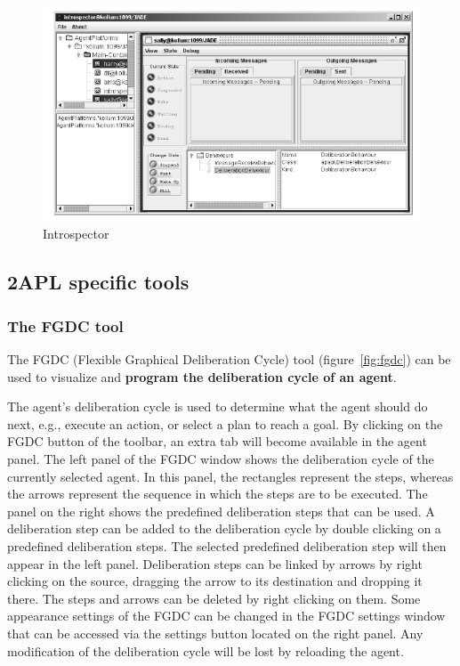 \documentclass[a4paper]{article}
\begin{document}
\begin{figure}[htp]
\centering
\includegraphics[keepaspectratio,scale=0.7]{fig/introspector.png}
\caption{Introspector}
\label{fig:introspector}
\end{figure}

\subsection{2APL specific tools}

\subsubsection{The FGDC tool}

The FGDC (Flexible Graphical Deliberation Cycle) tool (figure~\ref{fig:fgdc}) can be used to visualize and \textbf{program the deliberation cycle of an agent}.

The agent's deliberation cycle is used to determine what the agent should do next, e.g., execute an action, or select a plan to reach a goal. By clicking on the FGDC button of the toolbar, an extra tab will become available in the agent panel. The left panel of the FGDC window shows the deliberation cycle of the currently selected agent. In this panel, the rectangles represent the steps, whereas the arrows represent the sequence in which the steps are to be executed. The panel on the right shows the predefined deliberation steps that can be used. A deliberation step can be added to the deliberation cycle by double clicking on a predefined deliberation steps. The selected predefined deliberation step will then appear in the left panel. Deliberation steps can be linked by arrows by right clicking on the source, dragging the arrow to its destination and dropping it there. The steps and arrows can be deleted by right clicking on them. Some appearance settings of the FGDC can be changed in the FGDC settings window that can be accessed via the settings button located on the right panel. Any modification of the deliberation cycle will be lost by reloading the agent.
\end{document}

